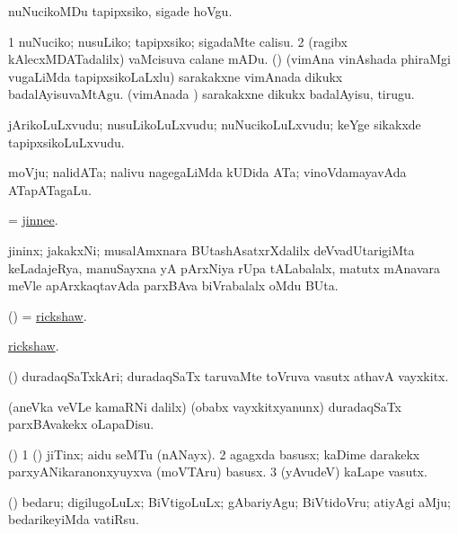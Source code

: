 \bentry
{}
\gl{\sakirx}
\bmng
nuNucikoMDu tapipxsiko, sigade hoVgu. 
\emng

\noindent
\gl{\akirx}
\bmng
\bnum
\num{1} nuNuciko; nusuLiko; tapipxsiko; sigadaMte calisu. 
\num{2} (ragibx kAlecxMDATadalilx) vaMcisuva calane mADu. 
 (\ashi) 
\banum
{} (vimAna vinAshada phiraMgi \mo vugaLiMda tapipxsikoLaLxlu) sarakakxne vimAnada dikukx badalAyisuvaMtAgu. 
 (vimAnada \vi) sarakakxne dikukx badalAyisu, tirugu. 
\eanum
\numie
\enum
\emng
\eentry

\bentry
{}
\gl{\nA}
\bmng
jArikoLuLxvudu; nusuLikoLuLxvudu; nuNucikoLuLxvudu; keYge sikakxde tapipxsikoLuLxvudu. 
\emng

\noindent
\gl{\nuga}
\bmng
{} moVju; nalidATa; nalivu nagegaLiMda kUDida ATa; vinoVdamayavAda ATapATagaLu. 
\emng
\eentry

\bentry
{}
\gl{\nA}
\bmng
 = \hyperlink{jinnee}{jinnee}. 
\emng
\eentry

\bentry
{}
\gl{\nA}
\bmng
jininx; jakakxNi; musalAmxnara BUtashAsatxrXdalilx deVvadUtarigiMta keLadajeRya, manuSayxna yA pArxNiya rUpa tALabalalx, matutx mAnavara meVle apArxkaqtavAda parxBAva biVrabalalx oMdu BUta. 
\emng
\eentry

\bentry
{}
\gl{\nA}
\bmng
(\pArxparx) = \hyperref{kandict_r.pdf}{R}{rickshaw}{rickshaw}. 
\emng
\eentry

\bentry
{}
\gl{\nA}
\bmng
\hyperref{kandict_r.pdf}{R}{rickshaw}{rickshaw}. 
\emng
\eentry

\bentry
{}
\gl{\nA}
\bmng
(\AmA) duradaqSaTxkAri; duradaqSaTx taruvaMte toVruva vasutx athavA vayxkitx. 
\emng
\eentry

\bentry
{}
\gl{\sakirx}
\bmng
(aneVka veVLe kamaRNi \parx dalilx) (obabx vayxkitxyanunx) duradaqSaTx parxBAvakekx oLapaDisu. 
\emng
\eentry

\bentry
{}
\gl{\nA}
\bmng
(\ame) 
\bnum
\num{1} (\ashi) jiTinx; aidu seMTu (nANayx). 
\num{2} agagxda basusx; kaDime darakekx parxyANikaranonxyuyxva (moVTAru) basusx. 
\num{3} (yAvudeV) kaLape vasutx. 
\enum
\emng
\eentry

\bentry
{}
\gl{\akirx}
\bmng
(\AmA) bedaru; digilugoLuLx; BiVtigoLuLx; gAbariyAgu; BiVtidoVru; atiyAgi aMju; bedarikeyiMda vatiRsu. 
\emng
\eentry

